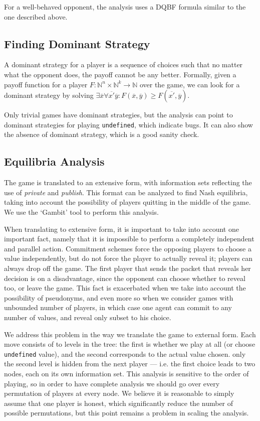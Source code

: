 \documentclass[acmsmall,review,anonymous]{acmart}\settopmatter{printfolios=true,printccs=false,printacmref=false}
\begin{document}
For a well-behaved opponent, the analysis uses a DQBF formula similar to the one described above.

\subsection{Finding Dominant Strategy}
A dominant strategy for a player is a sequence of choices such that no matter what the opponent does, the payoff cannot be any better. Formally, given a payoff function for a player
$F : \mathbb{N}^n \times \mathbb{N}^k \rightarrow \mathbb{N}$
over the game, we can look for a dominant strategy by solving
$\exists \overline{x} \forall \overline{x'} \overline{y}: F(\overline{x}, \overline{y})\geq F(\overline{x'}, \overline{y})$.

Only trivial games have dominant strategies, but the analysis can point to dominant strategies for playing \texttt{undefined}, which indicate bugs. It can also show the absence of dominant strategy, which is a good sanity check.

\subsection{Equilibria Analysis}
The game is translated to an extensive form, with information sets reflecting the use of \emph{private} and \emph{publish}.
This format can be analyzed to find Nash equilibria, taking into account the possibility of players quitting in the middle of the game. We use the `Gambit' tool to perform this analysis.

When translating to extensive form, it is important to take into account one important fact, namely that it is impossible to perform a completely independent and parallel action. Commitment schemes force the opposing players to choose a value independently, but do not force the player to actually reveal it; players can always drop off the game. The first player that sends the packet that reveals her decision is on a disadvantage, since the opponent can choose whether to reveal too, or leave the game. This fact is exacerbated when we take into account the possibility of pseudonyms, and even more so when we consider games with unbounded number of players, in which case one agent can commit to any number of values, and reveal only subset to his choice.

We address this problem in the way we translate the game to external form. Each move consists of to levels in the tree: the first is whether we play at all (or choose \texttt{undefined} value), and the second corresponds to the actual value chosen. only the second level is hidden from the next player --- i.e. the first choice leads to two nodes, each on its own information set. This analysis is sensitive to the order of playing, so in order to have complete analysis we should go over every permutation of players at every node. We believe it is reasonable to simply assume that one player is honest, which significantly reduce the number of possible permutations, but this point remains a problem in scaling the analysis.
\end{document}
